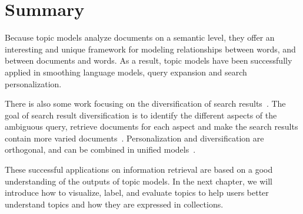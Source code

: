 \section{Summary}

Because topic models analyze documents on a semantic level, they offer
an interesting and unique framework for modeling relationships between words, and between documents and words.
As a result, topic models have been
successfully applied in smoothing language models, query expansion and search personalization.

There is also some work focusing on the diversification of search
results~\citep{Dang-2013,Santos-2015}. The goal of search result
diversification is to identify the different aspects of the ambiguous
query, retrieve documents for each aspect and make the search results
contain more varied documents~\citep{Dang-2013}. Personalization and
diversification are orthogonal, and can be combined in unified
models~\citep{Vallet-2012,Liang-2014}.

These successful applications on information retrieval are based on a good
understanding of the outputs of topic models. In the next chapter, we
will introduce how to visualize, label, and evaluate topics to
help users better understand topics and how they are expressed in collections.

